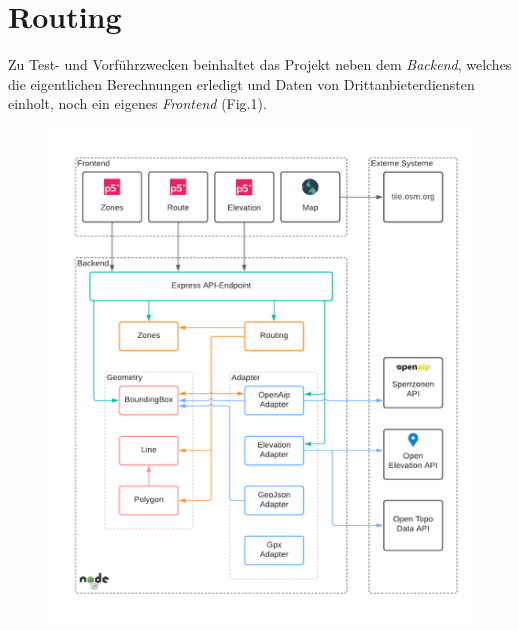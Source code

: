 \section*{Routing}

Zu Test- und Vorführzwecken beinhaltet das Projekt neben dem \textit{Backend}, welches die eigentlichen Berechnungen erledigt und Daten von Drittanbieterdiensten einholt, noch ein eigenes \textit{Frontend} (Fig.1).

\begin{figure}[h]
    \includegraphics[width=\columnwidth]{images/architektur}
\end{figure}




